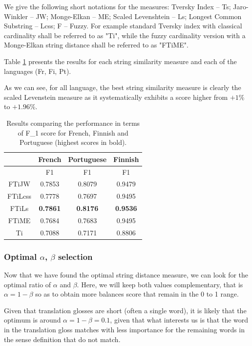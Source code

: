 \documentclass[10pt, a4paper]{article}
\begin{document}
We give the following short notations for the measures: Tversky Index -- Ts; Jaro-Winkler -- JW; Monge-Elkan -- ME; Scaled Levenshtein -- Ls; Longest Common Substring -- Lcss; F -- Fuzzy. For example standard Tversky index with classical cardinality shall be referred to as "Ti", while the fuzzy cardinality version with a Monge-Elkan string distance shall be referred to as "FTiME". 

Table \ref{tab:expe1} presents the results for each string similarity measure and each of the languages (Fr, Fi, Pt).

As we can see, for all language, the best string similarity measure is clearly the scaled Levenstein measure as it systematically exhibits a score higher from \(+1\%\) to \(+1.96\%\).

\begin{table}
{\centering \footnotesize
\begin{tabular}{|c|c|c|c|}
\hline &French&Portuguese&Finnish\\
\hline &F1&F1&F1\\
\hline FTiJW&0.7853&0.8079&0.9479\\
\hline FTiLcss&0.7778&0.7697&0.9495\\
\hline FTiLs&\textbf{0.7861}&\textbf{0.8176}&\textbf{0.9536}\\
\hline FTiME&0.7684&0.7683&0.9495\\
\hline Ti&0.7088&0.7171&0.8806\\
\hline 
\end{tabular} 
\caption{Results comparing the performance in terms of F\_1 score for French, Finnish and Portuguese (highest scores in bold).}
\label{tab:expe1}
}
\end{table}

\subsubsection{Optimal \(\alpha\), \(\beta\) selection}
Now that we have found the optimal string distance measure, we can look for the optimal ratio of \(\alpha\) and \(\beta\). Here, we will keep both values complementary, that is \(\alpha=1-\beta\) so as to obtain more balances score that remain in the 0 to 1 range. 

Given that translation glosses are short (often a single word), it is likely that the optimum is around \(\alpha=1-\beta=0.1\), given that what interests us is  that the word in the translation gloss matches with less importance for the remaining words in the sense definition that do not match.
\end{document}
